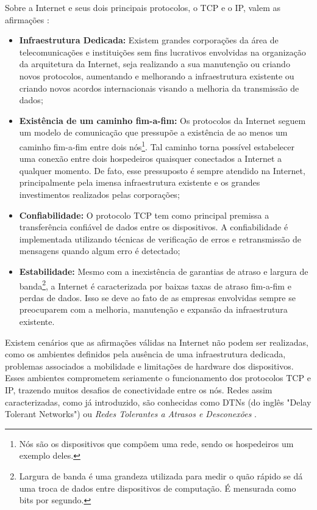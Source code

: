 Sobre a Internet e seus dois principais protocolos, o TCP e o IP, valem as afirmações \cite{kurose2010redes}:

\begin{itemize}
    \item \textbf{Infraestrutura Dedicada:} Existem grandes corporações da área de telecomunicações e instituições sem fins lucrativos envolvidas na organização da arquitetura da Internet, seja realizando a sua manutenção ou criando novos protocolos, aumentando e melhorando a infraestrutura existente ou criando novos acordos internacionais visando a melhoria da transmissão de dados;
    \item \textbf{Existência de um caminho fim-a-fim:} Os protocolos da Internet seguem um modelo de comunicação que pressupõe a existência de ao menos um caminho fim-a-fim entre dois nós\footnote{Nós são os dispositivos que compõem uma rede, sendo os hospedeiros um exemplo deles.}. Tal caminho torna possível estabelecer uma conexão entre dois hospedeiros quaisquer conectados a Internet a qualquer momento. De fato, esse pressuposto é sempre atendido na Internet, principalmente pela imensa infraestrutura existente e os grandes investimentos realizados pelas corporações;
    \item \textbf{Confiabilidade:} O protocolo TCP tem como principal premissa a transferência confiável de dados entre os dispositivos. A confiabilidade é implementada utilizando técnicas de verificação de erros e retransmissão de mensagens quando algum erro é detectado;
    \item \textbf{Estabilidade:} Mesmo com a inexistência de garantias de atraso e largura de banda\footnote{Largura de banda é uma grandeza utilizada para medir o quão rápido se dá uma troca de dados entre dispositivos de computação. É mensurada como bits por segundo.}, a Internet é caracterizada por baixas taxas de atraso fim-a-fim e perdas de dados. Isso se deve ao fato de as empresas envolvidas sempre se preocuparem com a melhoria, manutenção e expansão da infraestrutura existente.
\end{itemize}

Existem cenários que as afirmações válidas na Internet não podem ser realizadas, como os ambientes definidos pela ausência de uma infraestrutura dedicada, problemas associados a mobilidade e limitações de hardware dos dispositivos. Esses ambientes comprometem seriamente o funcionamento dos protocolos TCP e IP, trazendo muitos desafios de conectividade entre os nós. Redes assim caracterizadas, como já introduzido, são conhecidas como DTNs (do inglês "Delay Tolerant Networks") ou \emph{Redes Tolerantes a Atrasos e Desconexões} \cite{alves2009redes}.


